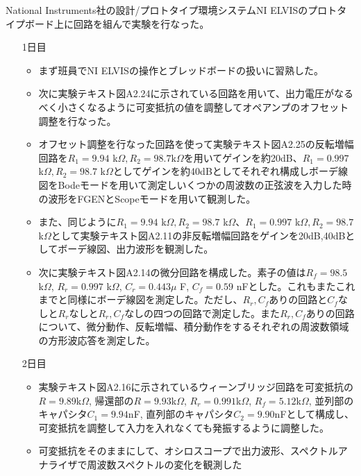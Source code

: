 \documentclass[dvipdfmx, twocolumn]{jsarticle}
\begin{document}
National Instruments社の設計/プロトタイプ環境システムNI ELVISのプロトタイプボード上に回路を組んで実験を行なった。
\begin{enumerate}
\item[1日目]

\begin{itemize}
\item まず班員でNI ELVISの操作とブレッドボードの扱いに習熟した。

\item 次に実験テキスト図A2.24に示されている回路を用いて、出力電圧がなるべく小さくなるように可変抵抗の値を調整してオペアンプのオフセット調整を行なった。

\item オフセット調整を行なった回路を使って実験テキスト図A2.25の反転増幅回路を$R_{1}=9.94$ k$\Omega, R_{2} = 98.7$k$\Omega$を用いてゲインを約20dB、$R_{1}=0.997$ k$\Omega, R_{2} = 98.7$ k$\Omega$としてゲインを約40dBとしてそれぞれ構成しボーデ線図をBodeモードを用いて測定しいくつかの周波数の正弦波を入力した時の波形をFGENとScopeモードを用いて観測した。

\item また、同じように$R_{1}=9.94$ k$\Omega, R_{2} = 98.7$ k$\Omega$、$R_{1}=0.997$ k$\Omega, R_{2} = 98.7$ k$\Omega$として実験テキスト図A2.11の非反転増幅回路をゲインを20dB,40dBとしてボーデ線図、出力波形を観測した。

\item 次に実験テキスト図A2.14の微分回路を構成した。素子の値は$R_{f} = 98.5$ k$\Omega$, $R_{r} = 0.997$ k$\Omega$, $C_{r} = 0.443\mu$ F, $C_{f} = 0.59$ nFとした。これもまたこれまでと同様にボーデ線図を測定した。ただし、$R_{r}, C_{f}$ありの回路と$C_{f}$なしと$R_{r}$なしと$R_{r}, C_{f}$なしの四つの回路で測定した。また$R_{r}, C_{f}$ありの回路について、微分動作、反転増幅、積分動作をするそれぞれの周波数領域の方形波応答を測定した。
\end{itemize}

\item[2日目]
\begin{itemize}

\item 実験テキスト図A2.16に示されているウィーンブリッジ回路を可変抵抗の$R = 9.89$k$\Omega$, 帰還部の$R = 9.93$k$\Omega$, $R_{r} = 0.991$k$\Omega$, $R_{f} = 5.12$k$\Omega$, 並列部のキャパシタ$C_{1} = 9.94$nF, 直列部のキャパシタ$C_{2} = 9.90$nFとして構成し、可変抵抗を調整して入力を入れなくても発振するように調整した。
\item 可変抵抗をそのままにして、オシロスコープで出力波形、スペクトルアナライザで周波数スペクトルの変化を観測した


\end{itemize}
\end{enumerate}
\end{document}
